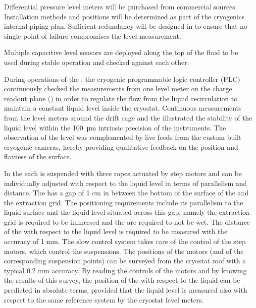 Differential pressure level meters will be purchased from commercial sources.
Installation methods and positions will be determined as part of the
cryogenics internal piping plan.  Sufficient redundancy will be designed in
to ensure that no single point of failure compromises the level measurement.

Multiple capacitive level sensors are deployed along the top of
the fluid to be used during stable operation and checked against each
other.

During operations of the , the cryogenic programmable logic controller (PLC) continuously checked the measurements from one level meter on the charge readout plane () in order to regulate the flow from the liquid recirculation to maintain a constant liquid level inside the cryostat. Continuous measurements from the level meters around the drift cage and the  illustrated the stability of the liquid level within the \SI{100}{\micro\meter} intrinsic precision of the instruments. The observation of the level was complemented by live feeds from the custom built cryogenic cameras, hereby providing qualitative feedback on the position and flatness of the surface.

In the  each  is suspended with three ropes actuated by step motors and can be individually adjusted with respect to the liquid level in terms of parallelism and distance. The  has a gap of 1 cm in between the bottom of the surface of the  and the extraction grid. The  positioning requirements include its parallelism to the liquid surface and the liquid level situated across this gap, namely the extraction grid is required to be immersed and the  are required to not be wet.  The distance of the  with respect to the liquid level is required to be measured with the accuracy of 1 mm. The slow control system takes care of the control of the step motors, which control the  suspensions. The positions of the motors (and of the corresponding suspension points) can be surveyed from the cryostat roof with a typical 0.2 mm accuracy. By reading the controls of the motors and by knowing the results of this survey, the position of the  with respect to the liquid can be predicted in absolute terms, provided that the liquid level is measured also with respect to the same reference system by the cryostat level meters. 
 
